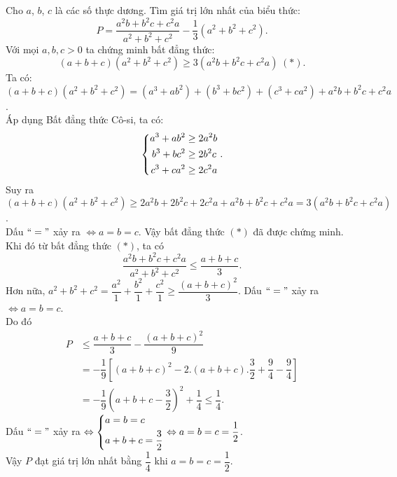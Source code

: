\begin{ex}%
Cho $a$, $b$, $c$ là các số thực dương. Tìm giá trị lớn nhất của biểu thức:
$$P=\dfrac{a^2b+b^2c+c^2a}{a^2+b^2+c^2}-\dfrac{1}{3}(a^2+b^2+c^2).$$
\loigiai
{Với mọi $a, b, c>0$ ta chứng minh bất đẳng thức: 
$$(a+b+c)(a^2+b^2+c^2) \ge 3(a^2b+b^2c+c^2a) \hspace{3pt} (\ast).$$
Ta có: $(a+b+c)(a^2+b^2+c^2)=(a^3+ab^2)+(b^3+bc^2)+(c^3+ca^2)+a^2b+b^2c+c^2a$.\\
Áp dụng Bất đẳng thức Cô-si, ta có:
$$\left\{\begin{aligned}a^3+ab^2 &\ge 2a^2b\\b^3+bc^2 &\ge 2b^2c\\c^3+ca^2 &\ge 2c^2a\end{aligned}\right..$$
Suy ra $(a+b+c)(a^2+b^2+c^2) \ge 2a^2b+2b^2c+2c^2a+a^2b+b^2c+c^2a=3(a^2b+b^2c+c^2a)$.\\
Dấu $``="$ xảy ra $\Leftrightarrow a=b=c$. Vậy bất đẳng thức $(\ast)$ đã được chứng minh.\\
Khi đó từ  bất đẳng thức $(\ast)$, ta có 
$$\dfrac{a^2b+b^2c+c^2a}{a^2+b^2+c^2} \le \dfrac{a+b+c}{3}.$$
Hơn nữa, $a^2+b^2+c^2=\dfrac{a^2}{1}+\dfrac{b^2}{1}+\dfrac{c^2}{1} \ge \dfrac{(a+b+c)^2}{3}$. Dấu $``="$ xảy ra $\Leftrightarrow a=b=c$.\\
Do đó 
\begin{align*}
P &\le \dfrac{a+b+c}{3}-\dfrac{(a+b+c)^2}{9}\\
&=-\dfrac{1}{9}\left[(a+b+c)^2-2.(a+b+c).\dfrac{3}{2}+\dfrac{9}{4}-\dfrac{9}{4}\right]\\
&=-\dfrac{1}{9}\left(a+b+c-\dfrac{3}{2}\right)^2+\dfrac{1}{4} \le \dfrac{1}{4}.
\end{align*}
Dấu $``="$ xảy ra $\Leftrightarrow \left\{\begin{aligned}&a=b=c\\&a+b+c=\dfrac{3}{2}\end{aligned}\right. \Leftrightarrow a=b=c=\dfrac{1}{2}$.\\
Vậy $P$ đạt giá trị lớn nhất bằng $\dfrac{1}{4}$ khi $a=b=c=\dfrac{1}{2}$.}
\end{ex}

